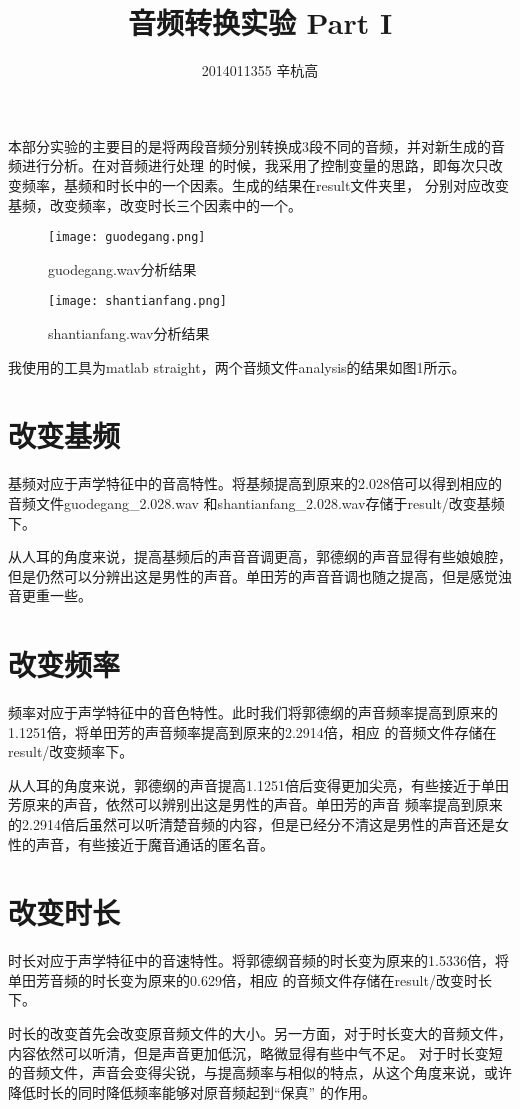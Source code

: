 \documentclass{ctexart}
\author{2014011355 辛杭高}
\title{音频转换实验 Part I}
\begin{document}
\maketitle
本部分实验的主要目的是将两段音频分别转换成3段不同的音频，并对新生成的音频进行分析。在对音频进行处理
的时候，我采用了控制变量的思路，即每次只改变频率，基频和时长中的一个因素。生成的结果在result文件夹里，
分别对应改变基频，改变频率，改变时长三个因素中的一个。

\begin{figure}  
\begin{minipage}[t]{0.5\linewidth}  
\centering  
\texttt{[image: guodegang.png]}  
\caption{guodegang.wav分析结果}  
\label{fig:side:a}  
\end{minipage}%
\begin{minipage}[t]{0.5\linewidth}  
\centering  
\texttt{[image: shantianfang.png]}  
\caption{shantianfang.wav分析结果}  
\label{fig:side:b}  
\end{minipage}  
\end{figure} 

我使用的工具为matlab straight，两个音频文件analysis的结果如图1所示。

\section{改变基频}
基频对应于声学特征中的音高特性。将基频提高到原来的2.028倍可以得到相应的音频文件guodegang\_2.028.wav
和shantianfang\_2.028.wav存储于result/改变基频下。

从人耳的角度来说，提高基频后的声音音调更高，郭德纲的声音显得有些娘娘腔，
但是仍然可以分辨出这是男性的声音。单田芳的声音音调也随之提高，但是感觉浊音更重一些。

\section{改变频率}
频率对应于声学特征中的音色特性。此时我们将郭德纲的声音频率提高到原来的1.1251倍，将单田芳的声音频率提高到原来的2.2914倍，相应
的音频文件存储在result/改变频率下。

从人耳的角度来说，郭德纲的声音提高1.1251倍后变得更加尖亮，有些接近于单田芳原来的声音，依然可以辨别出这是男性的声音。单田芳的声音
频率提高到原来的2.2914倍后虽然可以听清楚音频的内容，但是已经分不清这是男性的声音还是女性的声音，有些接近于魔音通话的匿名音。

\section{改变时长}
时长对应于声学特征中的音速特性。将郭德纲音频的时长变为原来的1.5336倍，将单田芳音频的时长变为原来的0.629倍，相应
的音频文件存储在result/改变时长下。

时长的改变首先会改变原音频文件的大小。另一方面，对于时长变大的音频文件，内容依然可以听清，但是声音更加低沉，略微显得有些中气不足。
对于时长变短的音频文件，声音会变得尖锐，与提高频率与相似的特点，从这个角度来说，或许降低时长的同时降低频率能够对原音频起到“保真”
的作用。
\end{document}
